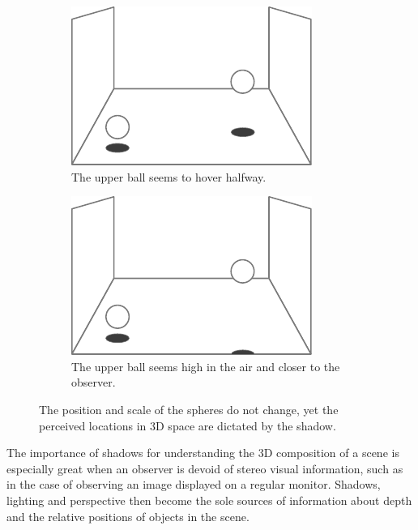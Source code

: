 \begin{figure}[!b]
    \begin{subfigure}{0.4\textwidth}
        \includegraphics[width=\textwidth]{./graf/shadow_example_shadow_2.pdf}
        \caption{The upper ball seems to hover halfway.}
        \label{fig:shadow_balls_shadow_2}
    \end{subfigure}
    \hfill
    \begin{subfigure}{0.4\textwidth}
        \includegraphics[width=\textwidth]{./graf/shadow_example_shadow_3.pdf}
        \caption{The upper ball seems high in the air and closer to the observer.}
        \label{fig:shadow_balls_shadow_3}
    \end{subfigure}
        
    \caption{The position and scale of the spheres do not change, yet the perceived locations in 3D space are dictated by the shadow.}
    \label{fig:shadow_balls_example}
\end{figure}
The importance of shadows for understanding the 3D composition of a scene is especially great when an observer is devoid of stereo visual information, such as in the case of observing an image displayed on a regular monitor. Shadows, lighting and perspective then become the sole sources of information about depth and the relative positions of objects in the scene.

